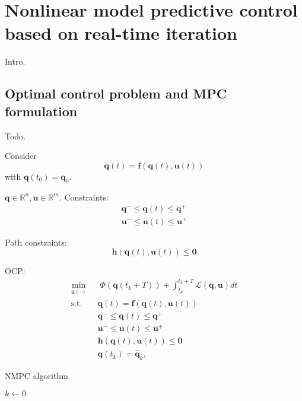 \chapter{Nonlinear model predictive control based on real-time iteration}
Intro.

\section{Optimal control problem and MPC formulation}
Todo.

Consider
\begin{equation*}
    \dot{\bm{q}}(t) = \bm{f}(\bm{q}(t), \bm{u}(t))
\end{equation*}
with $\bm{q}(t_0)=\bm{q}_0$.

$\bm{q}\in\mathbb{R}^n, \bm{u}\in\mathbb{R}^m$. Constraints:
\begin{gather*}
    \bm{q}^- \le \bm{q}(t) \le \bm{q}^+ \\
    \bm{u}^- \le \bm{u}(t) \le \bm{u}^+
\end{gather*}

Path constraints:
\begin{equation*}
    \bm{h}(\bm{q}(t), \bm{u}(t)) \le \bm{0}
\end{equation*}

OCP:
\begin{equation}
    \label{eq:OCP}
    \begin{aligned}
        \min_{\bm{u}(\cdot)} \;\;
            & \; \Phi(\bm{q}(t_k + T)) + \int_{t_k}^{t_k + T} \mathcal{L}(\bm{q}, \bm{u}) dt \\
            \text{s.t. } & \dot{\bm{q}}(t) = \bm{f}(\bm{q}(t), \bm{u}(t)) \\
                         & \bm{q}^- \le \bm{q}(t) \le \bm{q}^+ \\
                         & \bm{u}^- \le \bm{u}(t) \le \bm{u}^+ \\
                         & \bm{h}(\bm{q}(t), \bm{u}(t)) \le \bm{0} \\
                         & \bm{q}(t_k) = \hat{\bm{q}}_k,
    \end{aligned}
\end{equation}

\begin{algorithm}
	\small
	\caption{NMPC algorithm}
	\label{alg:NMPC}
    $k \leftarrow 0$\;
\end{algorithm}

